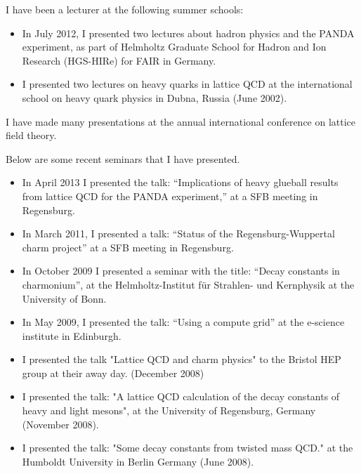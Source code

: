 \documentclass[12pt]{article}
\begin{document}
I have been a lecturer at the following summer schools:

\begin{itemize}

\item In July 2012, I presented two lectures
      about hadron physics and the PANDA experiment, as part of
      Helmholtz Graduate School for Hadron and 
      Ion Research (HGS-HIRe) for FAIR in Germany.

\item I presented two lectures on
heavy quarks in lattice QCD at the international school on heavy quark
physics in Dubna, Russia (June 2002). 

\end{itemize}


I have made many presentations at the annual international conference
on lattice field theory. 

Below are some recent seminars that I have presented.

\begin{itemize}

\item In April 2013 I presented the talk:
``Implications of heavy glueball results from lattice
QCD for the PANDA experiment,'' at a SFB meeting
in Regensburg.

\item In March 2011, I presented a talk:
``Status of the Regensburg-Wuppertal charm project''
at a SFB meeting in Regensburg.

\item In October 2009 I presented a seminar with the title:
       ``Decay constants in charmonium'', at the
       Helmholtz-Institut für Strahlen- und Kernphysik
       at the University of Bonn.

\item In May 2009, I presented the talk: 
      ``Using a compute grid'' at the e-science institute
       in Edinburgh.

\item I presented the talk "Lattice QCD and charm physics"  to the
      Bristol HEP group at their away day. (December 2008)

\item I presented 
      the talk: "A lattice QCD calculation of the decay 
      constants of heavy and light mesons", 
       at the University of Regensburg, Germany
      (November 2008).

\item I presented the talk: "Some decay constants from twisted mass QCD."
      at the Humboldt University in Berlin Germany (June 2008).

\end{itemize}
\end{document}
